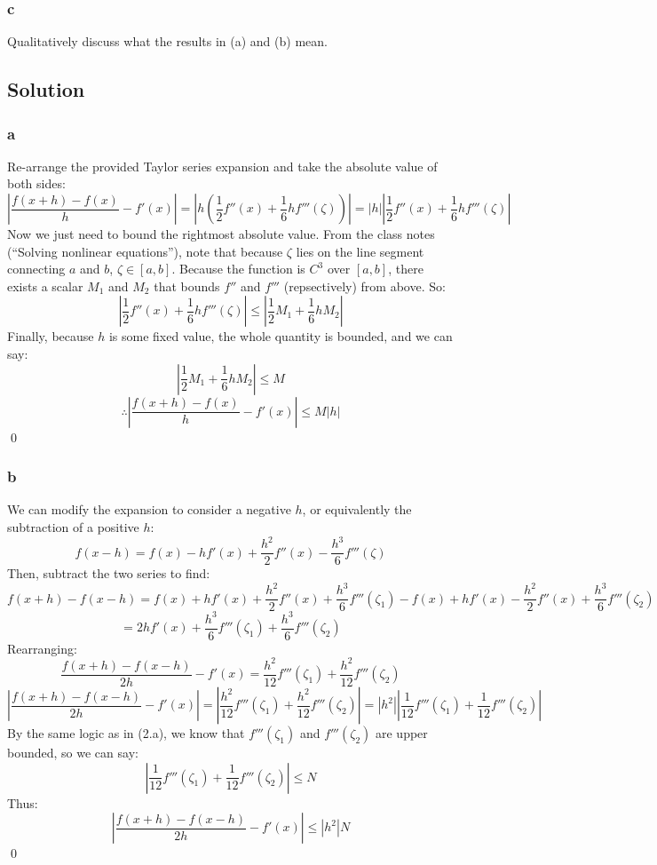 \documentclass[11pt]{report}
\theoremstyle{definition}
\begin{document}
\subsubsection*{c}
Qualitatively discuss what the results in (a) and (b) mean.

\subsection*{Solution}
\subsubsection*{a}
Re-arrange the provided Taylor series expansion and take the absolute value of both sides:
\[
	\left|\frac{f(x+h)-f(x)}{h} - f'(x)\right|
	= \left|h(\frac{1}{2}f''(x)+\frac{1}{6}hf'''(\zeta))\right|
	= \left|h\right|\left|\frac{1}{2}f''(x)+\frac{1}{6}hf'''(\zeta)\right|
\]
Now we just need to bound the rightmost absolute value. From the class notes
(``Solving nonlinear equations''), note that because $\zeta$ lies on the line
segment connecting $a$ and $b$, $\zeta\in[a,b]$. Because the function is $C^3$
over $[a,b]$, there exists a scalar $M_1$ and $M_2$ that bounds $f''$ and $f'''$
(repsectively) from above. So:
\[
	\left|\frac{1}{2}f''(x)+\frac{1}{6}hf'''(\zeta)\right|
	\leq\left|\frac{1}{2}M_1 + \frac{1}{6}hM_2\right|
\]
Finally, because $h$ is some fixed value, the whole quantity is bounded, and we can say:
\[
	\left|\frac{1}{2}M_1 + \frac{1}{6}hM_2\right|
	\leq M
\]
\[
	\therefore
	\left|\frac{f(x+h)-f(x)}{h} - f'(x)\right|
	\leq M|h|
\]
\qed

\subsubsection*{b}
We can modify the expansion to consider a negative $h$, or equivalently the subtraction of
a positive $h$:
\[
	f(x-h) = f(x) - hf'(x) + \frac{h^2}{2}f''(x)-\frac{h^3}{6}f'''(\zeta)
\]
Then, subtract the two series to find:
\[
	f(x+h)-f(x-h)
	= f(x)+hf'(x)+\frac{h^2}{2}f''(x)+\frac{h^3}{6}f'''(\zeta_1)
	- f(x)+hf'(x)-\frac{h^2}{2}f''(x)+\frac{h^3}{6}f'''(\zeta_2)
\]
\[
	= 2hf'(x)+\frac{h^3}{6}f'''(\zeta_1)+\frac{h^3}{6}f'''(\zeta_2)
\]
Rearranging:
\[
	\frac{f(x+h)-f(x-h)}{2h} -f'(x)
	= \frac{h^2}{12}f'''(\zeta_1) + \frac{h^2}{12}f'''(\zeta_2)
\]
\[
	\left|\frac{f(x+h)-f(x-h)}{2h} -f'(x)\right|
	= \left| \frac{h^2}{12}f'''(\zeta_1) + \frac{h^2}{12}f'''(\zeta_2) \right|
	= \left|h^2\right|\left|\frac{1}{12}f'''(\zeta_1)+\frac{1}{12}f'''(\zeta_2)\right|
\]
By the same logic as in (2.a), we know that $f'''(\zeta_{1})$ and $f'''(\zeta_{2})$ are upper bounded, so we can say:
\[
	\left|\frac{1}{12}f'''(\zeta_1)+\frac{1}{12}f'''(\zeta_2)\right|\leq N
\]
Thus:
\[
	\left|\frac{f(x+h)-f(x-h)}{2h} -f'(x)\right|
	\leq \left|h^2\right|N
\]
\qed
\end{document}
